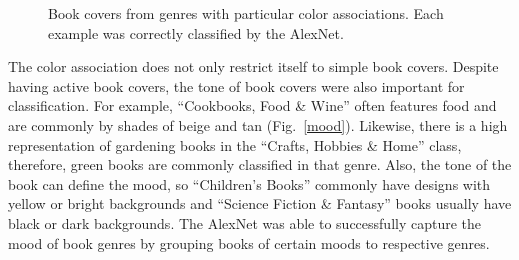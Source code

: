 \documentclass[conference]{IEEEtran}
\begin{document}
\begin{figure}
\begin{center}
\framebox[0.02\columnwidth]{ }
\framebox[0.02\columnwidth]{ }
\end{center}
\caption{\label{misclasspoly} Book covers from genres with particular color associations. Each example was correctly classified by the AlexNet.}
\end{figure}

The color association does not only restrict itself to simple book covers. 
Despite having active book covers, the tone of book covers were also important for classification.
For example, ``Cookbooks, Food \& Wine'' often features food and are commonly by shades of beige and tan (Fig.~\ref{mood}).
Likewise, there is a high representation of gardening books in the ``Crafts, Hobbies \& Home'' class, therefore, green books are commonly classified in that genre.
Also, the tone of the book can define the mood, so ``Children's Books'' commonly have designs with yellow or bright backgrounds and ``Science Fiction \& Fantasy'' books usually have black or dark backgrounds.
The AlexNet was able to successfully capture the mood of book genres by grouping books of certain moods to respective genres.
\end{document}
